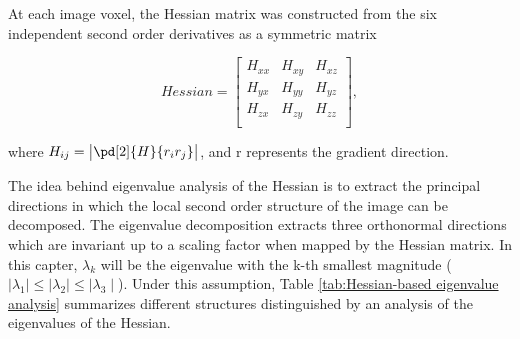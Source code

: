 {At each image voxel, the Hessian matrix was constructed from the six independent second order derivatives as a symmetric matrix

\begin{equation}
 \label{eq:FissureDetection4}
 Hessian = \begin{bmatrix} H_{xx} & H_{xy} & H_{xz} \\ H_{yx} & H_{yy} & H_{yz} \\ H_{zx} & H_{zy} & H_{zz} \\ \end{bmatrix},
\end{equation}

\noindent where $H_{ij} = \begin{vmatrix} \pd[2]{H}{r_i r_j} \\ \end{vmatrix}$, and r represents the gradient direction.

The idea behind eigenvalue analysis of the Hessian is to extract the principal directions in which the local second order structure of the image can be decomposed. The eigenvalue decomposition extracts three orthonormal directions which are invariant up to a scaling factor when mapped by the Hessian matrix. In this capter, $\lambda_k$ will be the eigenvalue with the k-th smallest magnitude ($\mid\lambda_{1}\mid\leq\mid\lambda_{2}\mid\leq\mid\lambda_{3}\mid$). Under this assumption, Table \ref{tab:Hessian-based eigenvalue analysis} summarizes different structures distinguished by an analysis of the eigenvalues of the Hessian.

}
